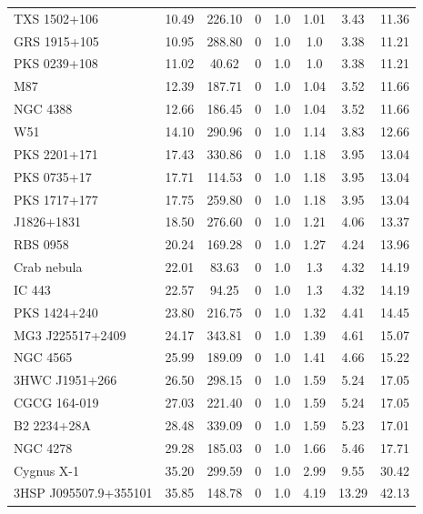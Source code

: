 \begin{longtable}{lccccccc}
TXS 1502+106	&	10.49	&	226.10	&	0	&	1.0	&	1.01	&	3.43	&	11.36	\\ 
GRS 1915+105	&	10.95	&	288.80	&	0	&	1.0	&	1.0	&	3.38	&	11.21	\\ 
PKS 0239+108	&	11.02	&	40.62	&	0	&	1.0	&	1.0	&	3.38	&	11.21	\\ 
M87	&	12.39	&	187.71	&	0	&	1.0	&	1.04	&	3.52	&	11.66	\\ 
NGC 4388	&	12.66	&	186.45	&	0	&	1.0	&	1.04	&	3.52	&	11.66	\\ 
W51	&	14.10	&	290.96	&	0	&	1.0	&	1.14	&	3.83	&	12.66	\\ 
PKS 2201+171	&	17.43	&	330.86	&	0	&	1.0	&	1.18	&	3.95	&	13.04	\\ 
PKS 0735+17	&	17.71	&	114.53	&	0	&	1.0	&	1.18	&	3.95	&	13.04	\\ 
PKS 1717+177	&	17.75	&	259.80	&	0	&	1.0	&	1.18	&	3.95	&	13.04	\\ 
J1826+1831	&	18.50	&	276.60	&	0	&	1.0	&	1.21	&	4.06	&	13.37	\\ 
RBS 0958	&	20.24	&	169.28	&	0	&	1.0	&	1.27	&	4.24	&	13.96	\\ 
Crab nebula	&	22.01	&	83.63	&	0	&	1.0	&	1.3	&	4.32	&	14.19	\\ 
IC 443	&	22.57	&	94.25	&	0	&	1.0	&	1.3	&	4.32	&	14.19	\\ 
PKS 1424+240	&	23.80	&	216.75	&	0	&	1.0	&	1.32	&	4.41	&	14.45	\\ 
MG3 J225517+2409	&	24.17	&	343.81	&	0	&	1.0	&	1.39	&	4.61	&	15.07	\\ 
NGC 4565	&	25.99	&	189.09	&	0	&	1.0	&	1.41	&	4.66	&	15.22	\\ 
3HWC J1951+266	&	26.50	&	298.15	&	0	&	1.0	&	1.59	&	5.24	&	17.05	\\ 
CGCG 164-019	&	27.03	&	221.40	&	0	&	1.0	&	1.59	&	5.24	&	17.05	\\ 
B2 2234+28A	&	28.48	&	339.09	&	0	&	1.0	&	1.59	&	5.23	&	17.01	\\ 
NGC 4278	&	29.28	&	185.03	&	0	&	1.0	&	1.66	&	5.46	&	17.71	\\ 
Cygnus X-1	&	35.20	&	299.59	&	0	&	1.0	&	2.99	&	9.55	&	30.42	\\ 
3HSP J095507.9+355101	&	35.85	&	148.78	&	0	&	1.0	&	4.19	&	13.29	&	42.13	\\ 
\hline
\end{longtable}
